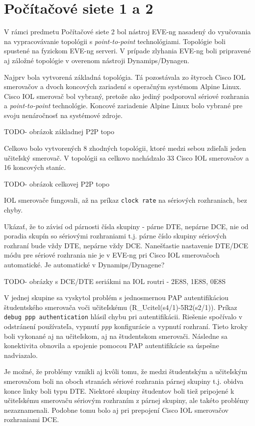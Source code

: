 \section{Počítačové siete 1 a 2}

V rámci predmetu Počítačové siete 2 bol nástroj EVE-ng nasadený do vyučovania na vypracovávanie topológii s \emph{point-to-point} technológiami. Topológie boli spustené na fyzickom EVE-ng serveri. V prípade zlyhania EVE-ng boli pripravené aj záložné topológie v overenom nástroji Dynamips/Dynagen.

Najprv bola vytvorená základná topológia. Tá pozostávala zo štyroch Cisco IOL smerovačov a dvoch koncových zariadení s operačným systémom Alpine Linux. Cisco IOL smerovač bol vybraný, pretože ako jediný podporoval sériové rozhrania a \emph{point-to-point} technológie. Koncové zariadenie Alpine Linux bolo vybrané pre svoju nenáročnosť na systémové zdroje.

{\huge TODO- obrázok základnej P2P topo}

Celkovo bolo vytvorených 8 zhodných topológii, ktoré medzi sebou zdieľali jeden učiteľský smerovač. V topológii sa celkovo nachádzalo 33 Cisco IOL smerovačov a 16 koncových staníc.

{\huge TODO- obrázok celkovej P2P topo}

IOL smerovače fungovali, až na príkaz \texttt{clock rate} na sériových rozhraniach, bez chyby.


Ukázať, že to závisí od párnosti čísla skupiny - párne DTE, nepárne DCE, nie od poradia skupín so sériovými rozhraniami t.j. párne číslo skupiny sériových rozhraní bude vždy DTE, nepárne vždy DCE. Nanešťastie nastavenie DTE/DCE módu pre sériové rozhrania nie je v EVE-ng pri Cisco IOL smerovačoch automatické. {\huge Je automatické v Dynamips/Dynagene?}

{\huge TODO- obrázky s DCE/DTE seriákmi na IOL routri - 2E8S, 1E8S, 0E8S}

V jednej skupine sa vyskytol problém s jednosmernou PAP autentifikáciou študentského smerovača voči učiteľskému (R\_Ucitel(s4/1)-5R2(s2/1)). Príkaz \texttt{debug ppp authentication} hlásil chybu pri autentifikácii. Riešenie spočívalo v odstránení používateľa, vypnutí \emph{ppp} konfigurácie a vypnutí rozhraní. Tieto kroky boli vykonané aj na učiteľskom, aj na študentskom smerovači. Následne sa konektivita obnovila a spojenie pomocou PAP autentifikácie sa úspešne nadviazalo.

Je možné, že problémy vznikli aj kvôli tomu, že medzi študentským a učiteľským smerovačom boli na oboch stranách sériové rozhrania párnej skupiny t.j. obidva konce linky boli typu DTE. Niektoré skupiny študentov boli tiež pripojené k učiteľskému smerovaču sériovým rozhraním z párnej skupiny, ale takéto problémy nezaznamenali. Podobne tomu bolo aj pri prepojení Cisco IOL smerovačov rozhraniami DCE.

